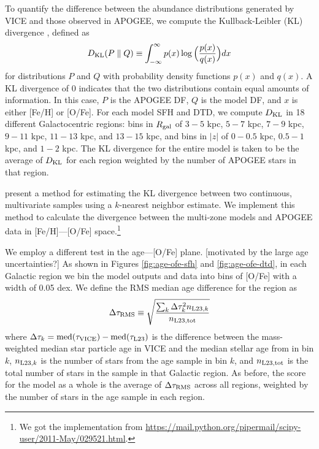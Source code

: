 \documentclass[modern,linenumbers]{aastex631}
\begin{document}
To quantify the difference between the abundance distributions generated by VICE and those observed in APOGEE, we compute the Kullback-Leibler (KL) divergence \citep{KullbackLeibler1951}, defined as
\begin{equation}
    D_{\rm{KL}}(P \parallel Q) \equiv \int_{-\infty}^{\infty} p(x) \log\Big(\frac{p(x)}{q(x)}\Big) dx
    \label{eq:kl-divergence}
\end{equation}
for distributions $P$ and $Q$ with probability density functions $p(x)$ and $q(x)$. A KL divergence of 0 indicates that the two distributions contain equal amounts of information. In this case, $P$ is the APOGEE DF, $Q$ is the model DF, and $x$ is either [Fe/H] or [O/Fe]. For each model SFH and DTD, we compute $D_{\rm{KL}}$ in 18 different Galactocentric regions: bins in $R_{\rm gal}$ of $3-5$ kpc, $5-7$ kpc, $7-9$ kpc, $9-11$ kpc, $11-13$ kpc, and $13-15$ kpc, and bins in $|z|$ of $0-0.5$ kpc, $0.5-1$ kpc, and $1-2$ kpc. The KL divergence for the entire model is taken to be the average of $D_{\rm{KL}}$ for each region weighted by the number of APOGEE stars in that region.

\citet{PerezCruz2008-KLTest2D} present a method for estimating the KL divergence between two continuous, multivariate samples using a $k$-nearest neighbor estimate. We implement this method to calculate the divergence between the multi-zone models and APOGEE data in [Fe/H]---[O/Fe] space.\footnote{We got the implementation from \url{https://mail.python.org/pipermail/scipy-user/2011-May/029521.html}.}

We employ a different test in the age---[O/Fe] plane. [motivated by the large age uncertainties?] As shown in Figures \ref{fig:age-ofe-sfh} and \ref{fig:age-ofe-dtd}, in each Galactic region we bin the model outputs and data into bins of [O/Fe] with a width of 0.05 dex. We define the RMS median age difference for the region as
\begin{equation}
    \Delta\tau_{\rm RMS} \equiv \sqrt{\frac{\sum_k \Delta\tau_k^2 n_{{\rm L23},k}}{n_{\rm L23,tot}}}
    \label{eq:age-ofe-score}
\end{equation}
where $\Delta\tau_k=\rm{med}(\tau_{\rm VICE})-\rm{med}(\tau_{\rm L23})$ is the difference between the mass-weighted median star particle age in VICE and the median stellar age from \citet{Leung2023-Ages} in bin $k$, $n_{{\rm L23},k}$ is the number of stars from the \citet{Leung2023-Ages} age sample in bin $k$, and $n_{\rm L23,tot}$ is the total number of stars in the sample in that Galactic region. As before, the score for the model as a whole is the average of $\Delta \tau_{\rm RMS}$ across all regions, weighted by the number of stars in the age sample in each region.
\end{document}
